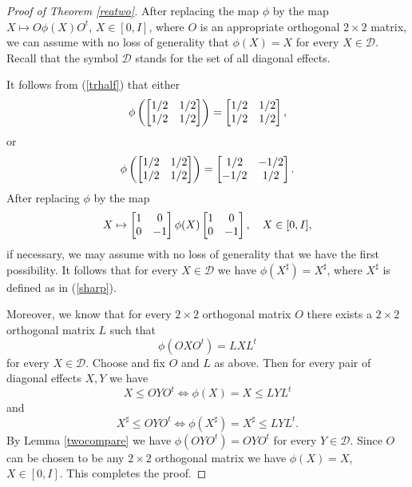 \documentclass{article}
\begin{document}
\begin{proof}[Proof of Theorem \ref{reatwo}]
After replacing the map $\phi$ by the map $X \mapsto O \phi (X) O^t$, $X \in [0,I]$, where $O$ is an appropriate orthogonal $2\times 2$ matrix, we can assume with no loss of generality that $\phi (X) = X$ for every $X \in \mathcal{D}$.
Recall that the symbol $\mathcal{D}$ stands for the set of all diagonal effects.

It follows from (\ref{trhalf}) that either
$$
\phi \left( \left[ \begin{matrix} 1/2 & 1/2 \cr 1/2 & 1/2 \cr \end{matrix} \right] \right) =  \left[ \begin{matrix} 1/2 & 1/2 \cr 1/2 & 1/2 \cr \end{matrix} \right] ,
$$
or
$$
\phi \left( \left[ \begin{matrix} 1/2 & 1/2 \cr 1/2 & 1/2 \cr \end{matrix} \right] \right) =  \left[ \begin{matrix} 1/2 & -1/2 \cr -1/2 & 1/2 \cr \end{matrix} \right] .
$$
After replacing $\phi$ by the map
$$
X \mapsto \left[ \begin{matrix} 1 & 0 \cr 0 & -1 \cr \end{matrix} \right] \phi (X) 
 \left[ \begin{matrix} 1 & 0 \cr 0 & -1 \cr \end{matrix} \right], \ \ \ X \in [0,I],
$$
if necessary,
we may assume with no loss of generality that we have the first possibility. It follows that for every $X \in \mathcal{D}$ we have $\phi (X^\sharp) = X^\sharp$, where $X^\sharp$ is defined as in (\ref{sharp}).

Moreover, we know that for every $2\times 2$ orthogonal matrix $O$ there exists a $2\times 2$ orthogonal matrix $L$ such that
$$
\phi (OXO^t) = LXL^t
$$
for every $X \in \mathcal{D}$. Choose and fix $O$ and $L$ as above. Then for every pair of diagonal effects $X,Y$ we have
$$
X\le OYO^t \iff \phi (X) = X \le LYL^t
$$
and
$$
X^\sharp\le OYO^t \iff \phi (X^\sharp) = X^\sharp \le LYL^t .
$$
By Lemma \ref{twocompare} we have $
\phi (OYO^t) = OYO^t
$
for every $Y \in \mathcal{D}$. Since $O$ can be chosen to be any $2 \times 2$ orthogonal matrix we have $\phi (X) = X$, $X \in [0,I]$. This completes the proof.  
\end{proof}
\end{document}
